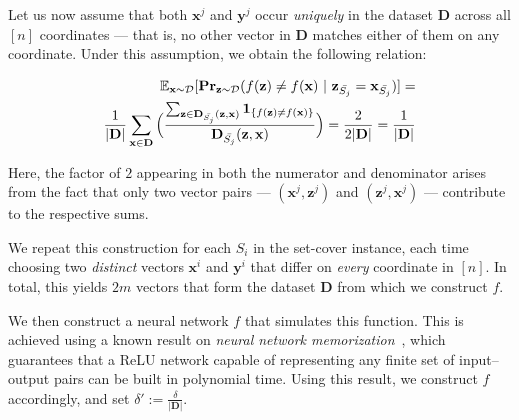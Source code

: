 \documentclass{article}
\newcommand{\z}{\textbf{z}}
\newcommand{\x}{\textbf{x}}
\newcommand{\y}{\textbf{y}}
\begin{document}
Let us now assume that both $\x^j$ and $\y^j$ occur \emph{uniquely} in the dataset $\mathbf{D}$ across all $[n]$ coordinates --- that is, no other vector in $\mathbf{D}$ matches either of them on any coordinate. Under this assumption, we obtain the following relation:


\begin{equation}
\begin{aligned}
\label{to_ref_neq_equation}
\mathbb{E}_{\x\sim\mathcal{D}}[\textbf{Pr}_{\z\sim \mathcal{D}}(f(\z) \neq f(\x) \ | \  \z_{\Bar{S_j}}= \x_{\Bar{S_j}})]=\\
\frac{1}{\lvert \textbf{D} \rvert}\sum_{\x\in\textbf{D}}\Big(\frac{\sum_{\z \in \textbf{D}_{\Bar{S_j}}(\z,\x)}\mathbf{1}_{\{f(\z)\neq f(\x)\}}}{\textbf{D}_{\Bar{S_j}}(\z,\x)}\Big)=\frac{2}{2\lvert\textbf{D}\rvert}=\frac{1}{\lvert\textbf{D}\rvert}
\end{aligned}
\end{equation}

Here, the factor of $2$ appearing in both the numerator and denominator arises from the fact that only two vector pairs --- $(\x^j, \z^j)$ and $(\z^j, \x^j)$ --- contribute to the respective sums.



We repeat this construction for each $S_i$ in the set-cover instance, each time choosing two \emph{distinct} vectors $\x^i$ and $\y^i$ that differ on \emph{every} coordinate in $[n]$. In total, this yields $2m$ vectors that form the dataset $ \mathbf{D}$ from which we construct $ f$.





We then construct a neural network $f$ that simulates this function. This is achieved using a known result on \emph{neural network memorization}~\citep{vardi2022optimal}, which guarantees that a ReLU network capable of representing any finite set of input–output pairs can be built in polynomial time. Using this result, we construct $f$ accordingly, and set $\delta' := \frac{\delta}{|\mathbf{D}|}$.
\end{document}
